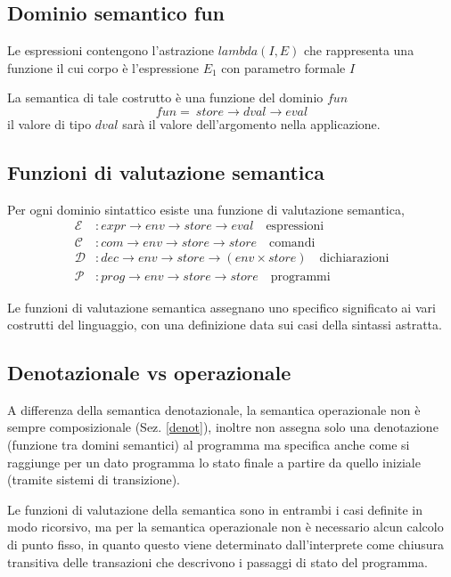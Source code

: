 \documentclass[a4paper, 10pt]{article}
\begin{document}
	\subsection{Dominio semantico fun}
		Le espressioni contengono l’astrazione $ lambda(I, E ) $ che rappresenta una funzione
		il cui corpo è l’espressione $ E_1 $ con parametro formale $ I $
		
		\noindent
		La semantica di tale costrutto è una funzione del dominio $ fun $
		\[
			fun = \: store \to dval \to eval
		\]
		il valore di tipo $ dval $ sarà il valore dell’argomento nella applicazione.
	
	\subsection{Funzioni di valutazione semantica}
	Per ogni dominio sintattico esiste una funzione di valutazione semantica, 
	\begin{align*}
	\mathcal{E}&:expr \to env \to store \to eval \quad \text{espressioni} \\
	\mathcal{C}&:com \to env \to store \to store \quad \text{comandi} \\
	\mathcal{D}&:dec \to env \to store \to (env \times store) \quad \text{dichiarazioni} \\
	\mathcal{P}&:prog \to env \to store \to store \quad \text{programmi}
	\end{align*}
	
	
	Le funzioni di valutazione semantica assegnano uno specifico significato ai vari costrutti del linguaggio, con una definizione data sui casi della sintassi astratta.
	
	\subsection{Denotazionale vs operazionale}
	A differenza della semantica denotazionale, la semantica operazionale non è sempre composizionale (Sez. \ref{denot}), inoltre non assegna solo una denotazione (funzione tra domini semantici) al programma ma specifica anche come si raggiunge per un dato programma lo stato finale a partire da quello iniziale (tramite sistemi di transizione).
	
	Le funzioni di valutazione della semantica sono in entrambi i casi definite in modo ricorsivo, ma per la semantica operazionale non è necessario alcun calcolo di punto fisso, in quanto questo viene determinato dall'interprete come chiusura transitiva delle transazioni che descrivono i passaggi di stato del programma. 
	
\end{document}
